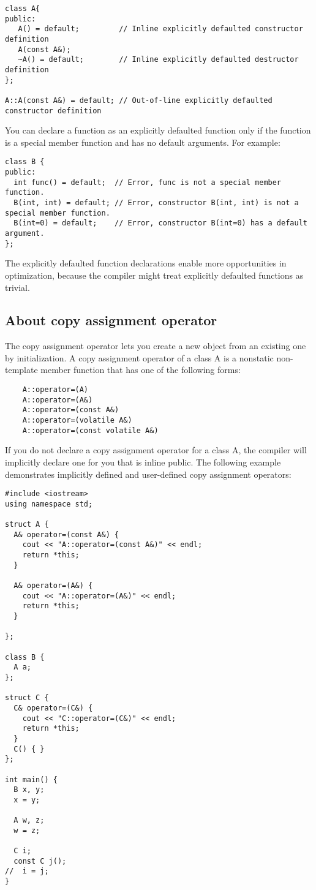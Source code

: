 \documentclass{book}
\begin{document}
\begin{lstlisting}
class A{
public:  
   A() = default;         // Inline explicitly defaulted constructor definition
   A(const A&);
   ~A() = default;        // Inline explicitly defaulted destructor definition
};

A::A(const A&) = default; // Out-of-line explicitly defaulted constructor definition 
\end{lstlisting}

You can declare a function as an explicitly defaulted function only if the function is a special member function and has no default arguments. For example:

\begin{lstlisting}
class B {
public:
  int func() = default;  // Error, func is not a special member function.
  B(int, int) = default; // Error, constructor B(int, int) is not a special member function.
  B(int=0) = default;    // Error, constructor B(int=0) has a default argument. 
};
\end{lstlisting}

The explicitly defaulted function declarations enable more opportunities in optimization, because the compiler might treat explicitly defaulted functions as trivial.


\subsection{About copy assignment operator}
The copy assignment operator lets you create a new object from an existing one by initialization. 
A copy assignment operator of a class A is a nonstatic non-template member function that has one of the following forms:

\begin{lstlisting}
    A::operator=(A)
    A::operator=(A&)
    A::operator=(const A&)
    A::operator=(volatile A&)
    A::operator=(const volatile A&)
\end{lstlisting}

If you do not declare a copy assignment operator for a class A, the compiler will implicitly declare one for you that is inline public.
The following example demonstrates implicitly defined and user-defined copy assignment operators:

\begin{lstlisting}
#include <iostream>
using namespace std;

struct A {
  A& operator=(const A&) {
    cout << "A::operator=(const A&)" << endl;
    return *this;
  }

  A& operator=(A&) {
    cout << "A::operator=(A&)" << endl;
    return *this;
  }

};

class B {
  A a;
};

struct C {
  C& operator=(C&) {
    cout << "C::operator=(C&)" << endl;
    return *this;
  }
  C() { }
};

int main() {
  B x, y;
  x = y;

  A w, z;
  w = z;

  C i;
  const C j();
//  i = j;
}
\end{lstlisting}
\end{document}
